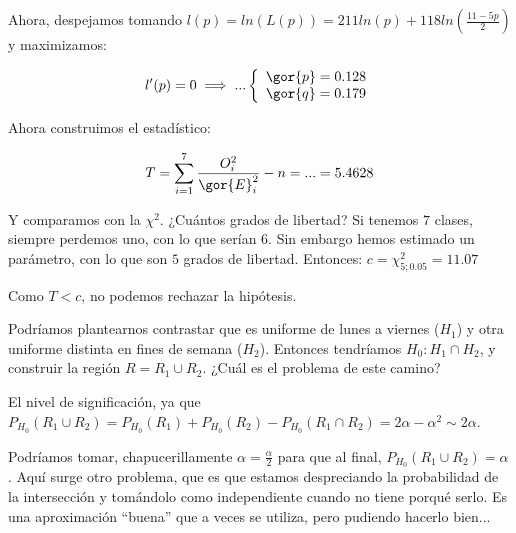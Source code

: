 \begin{problem}[4]
Ahora, despejamos tomando $l(p) = ln(L(p)) = 211 ln(p) + 118ln\left(\frac{11-5p}{2}\right)$ y maximizamos:

\[
l'(p) = 0 \implies ... \left\{\begin{array}{c} \gor{p} = 0.128\\ \gor{q} = 0.179 \end{array}\right.
\]


Ahora construimos el estadístico:

\[
T = \sum_{i=1}^7 \frac{O_i^2}{\gor{E}_i^2} - n = ... = 5.4628
\]

Y comparamos con la $\chi^2$. ¿Cuántos grados de libertad? Si tenemos $7$ clases, siempre perdemos uno, con lo que serían 6. Sin embargo hemos estimado un parámetro, con lo que son $5$ grados de libertad. Entonces: $ c = \chi^2_{5;0.05} = 11.07$

Como $T < c$, no podemos rechazar la hipótesis.

\obs
Podríamos plantearnos contrastar que es uniforme de lunes a viernes ($H_1$) y otra uniforme distinta en fines de semana ($H_2$). Entonces tendríamos $H_0 : H_1 \cap H_2$, y construir la región $R = R_1 \cup R_2$. ¿Cuál es el problema de este camino?

El nivel de significación, ya que $P_{H_0}(R_1 \cup R_2) = P_{H_0}(R_1) + P_{H_0}(R_2) - P_{H_0}(R_1\cap R_2) = 2α - α^2 \sim 2α$. 

Podríamos tomar, chapucerillamente $α = \frac{α}{2}$ para que al final, $P_{H_0} ( R_1 \cup R_2) = α$. Aquí surge otro problema, que es que estamos despreciando la probabilidad de la intersección y tomándolo como independiente cuando no tiene porqué serlo. Es una aproximación ``buena'' que a veces se utiliza, pero pudiendo hacerlo bien... 

\end{problem}



